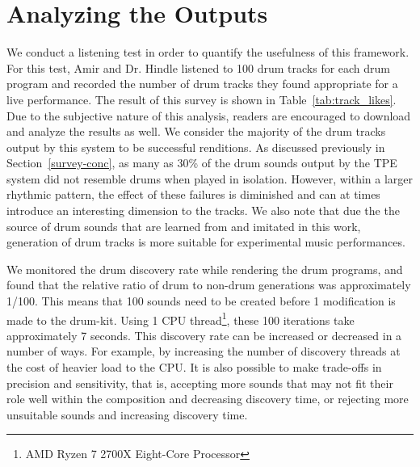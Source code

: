 \documentclass[\main/thesis.tex]{subfiles}
\begin{document}
\section{Analyzing the Outputs}
 We conduct a listening test in order to quantify the usefulness of this framework. For this test, Amir and Dr. Hindle  listened to 100 drum tracks for each drum program and recorded the number of drum tracks they found appropriate for a live performance. The result of this survey is shown in Table~\ref{tab:track_likes}. Due to the subjective nature of this analysis, readers are encouraged to download and analyze the results as well. We consider the majority of the drum tracks output by this system to be successful renditions. As discussed previously in Section~\ref{survey-conc}, as many as 30\% of the drum sounds output by the TPE system did not resemble drums when played in isolation. However, within a larger rhythmic pattern, the effect of these failures is diminished and can at times introduce an interesting dimension to the tracks. We also note that due the the source of drum sounds that are learned from and imitated in this work, generation of drum tracks is more suitable for experimental music performances.
 
  We monitored the drum discovery rate while rendering the drum programs, and found that the relative ratio of drum to non-drum generations was approximately 1/100. This means that 100 sounds need to be created before 1 modification is made to the drum-kit. Using 1 CPU thread\footnote{AMD Ryzen 7 2700X Eight-Core Processor}, these 100 iterations take approximately 7 seconds. This discovery rate can be increased or decreased in a number of ways. For example, by increasing the number of discovery threads at the cost of heavier load to the CPU. It is also possible to make trade-offs in precision and sensitivity, that is, accepting more sounds that may not fit their role well within the composition and decreasing discovery time, or rejecting more unsuitable sounds and increasing discovery time. 
\begin{table}[tbp]
\caption{\label{tab:track_likes} Measuring the quality of generated drum tracks}
\end{table}
\end{document}
